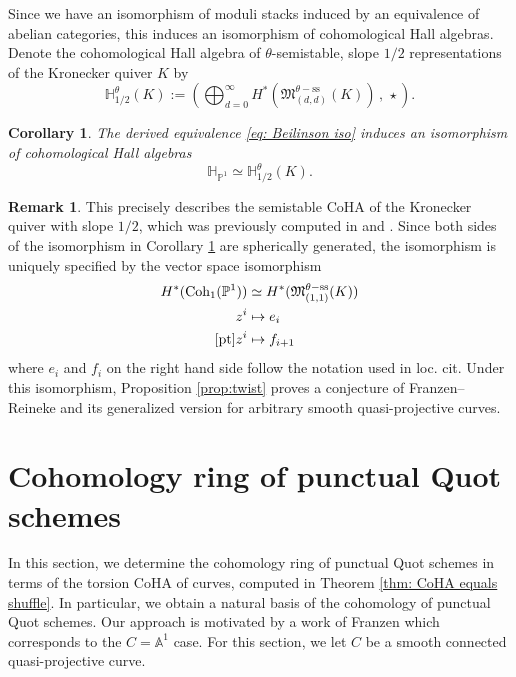 \documentclass[10pt]{amsart}
\newcommand{\BA}{\mathbb{A}}
\newcommand{\BP}{\mathbb{P}}
\newcommand{\BH}{\mathbb{H}}
\newcommand{\PP}{\mathbb{P}} %
\newcommand{\Coh}{\textnormal{Coh}}
\newcommand{\+}{{}^+}
\newcommand{\pt}{\textnormal{pt}}
\renewcommand{\ss}{\textnormal{ss}}
\newtheorem {corollary}[theorem]{Corollary}
\theoremstyle{definition}
\theoremstyle {definition}
\newtheorem{remark}[theorem]{Remark}
\theoremstyle {definition}
\begin{document}
Since we have an isomorphism of moduli stacks induced by an equivalence of abelian categories, this induces an isomorphism of cohomological Hall algebras. Denote the cohomological Hall algebra of $\theta$-semistable, slope $1/2$ representations of the Kronecker quiver $K$ by 
$$\BH^{\theta}_{1/2}(K):=\left(\bigoplus_{d=0}^\infty H^*(\mathfrak{M}^{\theta-\mathrm{ss}}_{(d,d)}(K))\,,\, \star\right).$$ 


\begin{corollary}\label{cor: Kronecker CoHA}
    The derived equivalence \eqref{eq: Beilinson iso} induces an isomorphism of cohomological Hall algebras
    \[\BH_{\PP^1}  \simeq  \BH^{\theta}_{1/2}(K). \]
\end{corollary}

\begin{remark}
    This precisely describes the semistable CoHA of the Kronecker quiver with slope $1/2$, which was previously computed in \cite{franzen2019cohomological} and \cite{Timm}. Since both sides of the isomorphism in Corollary \ref{cor: Kronecker CoHA} are spherically generated, the isomorphism is uniquely specified by the vector space isomorphism
    \begin{align*}
        H^*(\Coh_1(\BP^1))&\simeq H^*(\mathfrak{M}_{(1,1)}^{\theta-\ss}(K))\\
        z^i&\mapsto e_i\\
        [\pt]z^i&\mapsto f_{i+1}
    \end{align*}
    where $e_i$ and $f_i$ on the right hand side follow the notation used in loc. cit. Under this isomorphism, Proposition \ref{prop:twist} proves a conjecture of Franzen--Reineke \cite[Conj. 5]{franzen2019cohomological} and its generalized version for arbitrary smooth quasi-projective curves. 

\end{remark}





\section{Cohomology ring of punctual Quot schemes}
  
In this section, we determine the cohomology ring of punctual Quot schemes in terms of the torsion CoHA of curves, computed in Theorem \ref{thm: CoHA equals shuffle}. In particular, we obtain a natural basis of the cohomology of punctual Quot schemes. Our approach is motivated by a work of Franzen \cite{franzen} which corresponds to the $C=\BA^1$ case. For this section, we let $C$ be a smooth connected quasi-projective curve.
\end{document}
